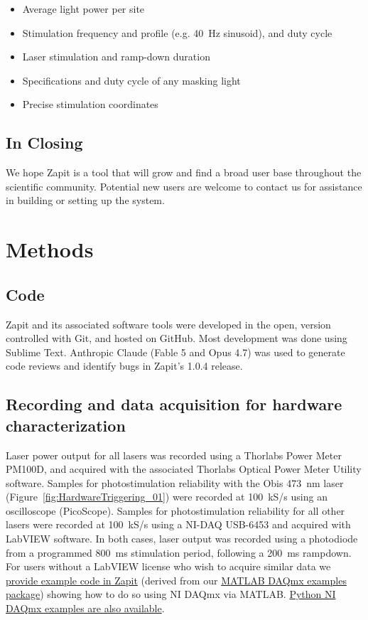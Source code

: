 \documentclass[9pt,lineno]{elife}
\begin{document}
\begin{itemize}
    \item Average light power per site
    \item Stimulation frequency and profile (e.g. 40~Hz sinusoid), and duty cycle
    \item Laser stimulation and ramp-down duration
    \item Specifications and duty cycle of any masking light
    \item     Precise stimulation coordinates

\end{itemize}

\subsection{In Closing}
We hope Zapit is a tool that will grow and find a broad user base throughout the scientific community.
Potential new users are welcome to contact us for assistance in building or setting up the system.
\section{Methods}

\subsection{Code}
Zapit and its associated software tools were developed in the open, version controlled with Git, and hosted on GitHub.
Most development was done using Sublime Text.
Anthropic Claude (Fable 5 and Opus 4.7) was used to generate code reviews and identify bugs in Zapit's 1.0.4 release.

\subsection{Recording and data acquisition for hardware characterization}
Laser power output for all lasers was recorded using a Thorlabs Power Meter PM100D, and acquired with the associated Thorlabs Optical Power Meter Utility software.
Samples for photostimulation reliability with the Obis 473~nm laser (Figure~\ref{fig:HardwareTriggering_01}) were recorded at 100~kS/s using an oscilloscope (PicoScope).
Samples for photostimulation reliability for all other lasers were recorded at 100~kS/s using a NI-DAQ USB-6453 and acquired with LabVIEW software.
In both cases, laser output was recorded using a photodiode from a programmed 800~ms stimulation period, following a 200~ms rampdown.
For users without a LabVIEW license who wish to acquire similar data we \href{https://github.com/Zapit-Optostim/zapit/blob/main/development/recordWaveforms/waveformRecorder.m}{provide example code in Zapit} (derived from our \href{https://github.com/SWC-Advanced-Microscopy/MATLAB_DAQmx_examples}{MATLAB DAQmx examples package}) showing how to do so using NI DAQmx via MATLAB.
\href{https://github.com/SWC-Advanced-Microscopy/Python_DAQmx_examples}{Python NI DAQmx examples are also available}.
\end{document}

